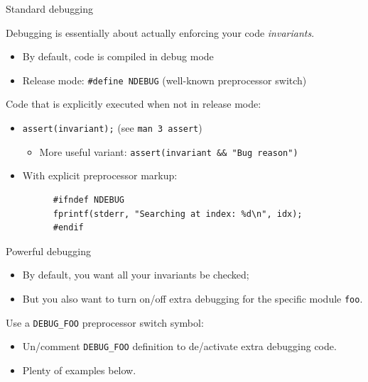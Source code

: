 \begin{frame}[fragile]{Standard debugging}


  Debugging is essentially about actually enforcing your code {\em invariants}.

  \begin{itemize}
  \item By default, code is compiled in debug mode
  \item Release mode: \lstinline{#define NDEBUG} (well-known preprocessor switch)
  \end{itemize}

  Code that is explicitly executed when not in release mode:
  \begin{itemize}
  \item \lstinline{assert(invariant);} (see \lstinline{man 3 assert})
    \begin{itemize}
    \item More useful variant: \lstinline{assert(invariant && "Bug reason")}
    \end{itemize}
  \item With explicit preprocessor markup:
    \begin{lstlisting}
      #ifndef NDEBUG
      fprintf(stderr, "Searching at index: %d\n", idx);
      #endif
    \end{lstlisting}
  \end{itemize}

\end{frame}


\begin{frame}[fragile]{Powerful debugging}

  \begin{itemize}
  \item By default, you want all your invariants be checked;
  \item But you also want to turn on/off extra debugging for the specific module \lstinline{foo}.
  \end{itemize}

  Use a \lstinline{DEBUG_FOO} preprocessor switch symbol:
  \begin{itemize}
  \item Un/comment \lstinline{DEBUG_FOO} definition to de/activate extra debugging code.
  \item Plenty of examples below.
  \end{itemize}

\end{frame}


